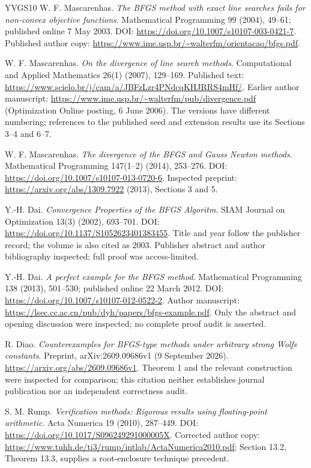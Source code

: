 \begin{thebibliography}{YVGS10}
 W. F. Mascarenhas. \emph{The BFGS method with exact line searches fails for non-convex objective functions}. Mathematical Programming 99 (2004), 49--61; published online 7 May 2003. DOI: \url{https://doi.org/10.1007/s10107-003-0421-7}. Published author copy: \url{https://www.ime.usp.br/~walterfm/orientacao/bfgs.pdf}.

 W. F. Mascarenhas. \emph{On the divergence of line search methods}. Computational and Applied Mathematics 26(1) (2007), 129--169. Published text: \url{https://www.scielo.br/j/cam/a/JBFzLzr4PNdcqKHJRRS4mHf/}. Earlier author manuscript: \url{https://www.ime.usp.br/~walterfm/pub/divergence.pdf} (Optimization Online posting, 6 June 2006). The versions have different numbering; references to the published seed and extension results use its Sections 3--4 and 6--7.

 W. F. Mascarenhas. \emph{The divergence of the BFGS and Gauss Newton methods}. Mathematical Programming 147(1--2) (2014), 253--276. DOI: \url{https://doi.org/10.1007/s10107-013-0720-6}. Inspected preprint: \url{https://arxiv.org/abs/1309.7922} (2013), Sections 3 and 5.

 Y.-H. Dai. \emph{Convergence Properties of the BFGS Algoritm}. SIAM Journal on Optimization 13(3) (2002), 693--701. DOI: \url{https://doi.org/10.1137/S1052623401383455}. Title and year follow the publisher record; the volume is also cited as 2003. Publisher abstract and author bibliography inspected; full proof was access-limited.

 Y.-H. Dai. \emph{A perfect example for the BFGS method}. Mathematical Programming 138 (2013), 501--530; published online 22 March 2012. DOI: \url{https://doi.org/10.1007/s10107-012-0522-2}. Author manuscript: \url{https://lsec.cc.ac.cn/pub/dyh/papers/bfgs-example.pdf}. Only the abstract and opening discussion were inspected; no complete proof audit is asserted.

 R. Diao. \emph{Counterexamples for BFGS-type methods under arbitrary strong Wolfe constants}. Preprint, arXiv:2609.09686v1 (9 September 2026). \url{https://arxiv.org/abs/2609.09686v1}. Theorem 1 and the relevant construction were inspected for comparison; this citation neither establishes journal publication nor an independent correctness audit.

 S. M. Rump. \emph{Verification methods: Rigorous results using floating-point arithmetic}. Acta Numerica 19 (2010), 287--449. DOI: \url{https://doi.org/10.1017/S096249291000005X}. Corrected author copy: \url{https://www.tuhh.de/ti3/rump/intlab/ActaNumerica2010.pdf}; Section 13.2, Theorem 13.3, supplies a root-enclosure technique precedent.


\end{thebibliography}
